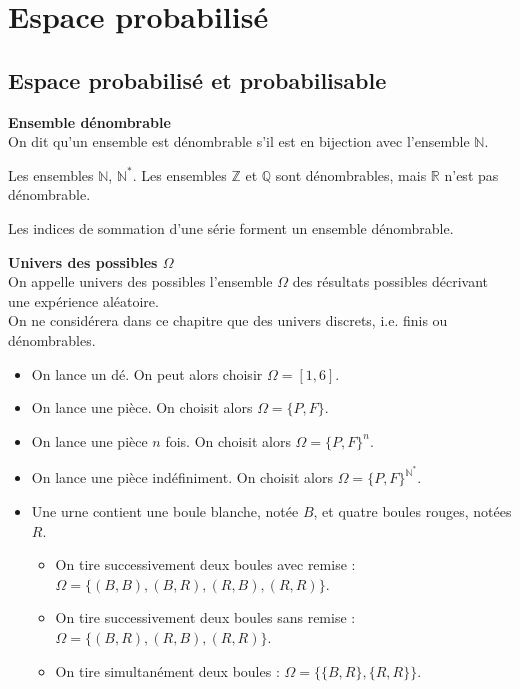 \documentclass[../PolyS4.tex]{subfiles}
\begin{document}
\setcounter{chapter}{2}
\chapter{Espace probabilisé}

\section{Espace probabilisé et probabilisable}


\begin{Def}\textbf{Ensemble dénombrable}\\

On dit qu'un ensemble est dénombrable s'il est en bijection avec l'ensemble $\mathbb{N}$.\\
\end{Def}
\begin{Ex}
Les ensembles $\mathbb{N}$, $\mathbb{N}^*$.
Les ensembles $\mathbb{Z}$ et $\mathbb{Q}$ sont dénombrables, mais $\mathbb{R}$ n'est pas dénombrable.\\
\end{Ex}

\begin{Rmq} 
Les indices de sommation d'une série forment un ensemble dénombrable.\\
\end{Rmq} 

\begin{Def}\textbf{Univers des possibles $\Omega$}\\
On appelle univers des possibles l'ensemble $\Omega$ des résultats possibles décrivant une expérience aléatoire.\\ 
On ne considérera dans ce chapitre que des univers discrets, i.e. finis ou dénombrables.\\
\end{Def}

\begin{Ex}
\begin{itemize}
    \item On lance un dé. On peut alors choisir $\Omega = [1, 6]$.
    \item On lance une pièce. On choisit alors $\Omega = \{P, F\}$.
    \item On lance une pièce $n$ fois. On choisit alors $\Omega = \{P, F\}^n$.
    \item On lance une pièce indéfiniment. On choisit alors $\Omega = \{P, F\}^{\mathbb{N}^*}$.
    \item Une urne contient une boule blanche, notée $B$, et quatre boules rouges, notées $R$.
    \begin{itemize}
        \item On tire successivement deux boules avec remise : $\Omega = \{(B, B), (B, R), (R, B), (R, R)\}$.
        \item On tire successivement deux boules sans remise : $\Omega = \{(B, R), (R, B), (R, R)\}$.
        \item On tire simultanément deux boules : $\Omega = \{\{B, R\}, \{R, R\}\}$.\\
    \end{itemize}
\end{itemize}
\end{Ex}
\end{document}
